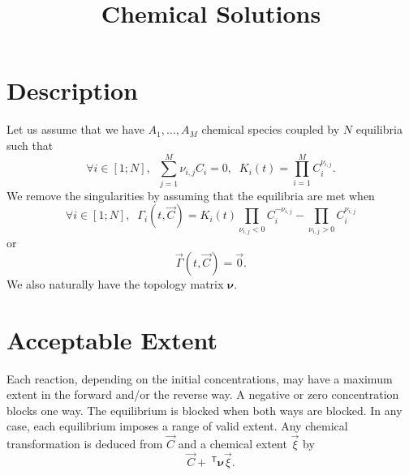 \documentclass[aps]{revtex4}
\newcommand{\mymat}[1]{\bm{#1}}
\newcommand{\mytrn}[1]{~^{\mathsf{T}}{#1}}
\begin{document}
\title{Chemical Solutions}

\section{Description}
Let us assume that we have $A_1,\ldots,A_M$ chemical species coupled by
$N$ equilibria such that
\begin{equation}
	\forall i \in [1;N], \;\; \sum_{j=1}^{M} \nu_{i,j} C_i = 0, \;\; K_i(t) = \prod_{i=1}^{M} C_i^{\nu_{i,j}}.
\end{equation}
We remove the singularities by assuming that the equilibria are met when
\begin{equation}
	\forall i \in [1;N], \;\; \Gamma_i(t,\vec{C}) = K_i(t) \prod_{\nu_{i,j}<0}  C_i^{-\nu_{i,j}} -  \prod_{\nu_{i,j}>0} C_i^{\nu_{i,j}} 
\end{equation}
or
\begin{equation}
	\vec{\Gamma}(t,\vec{C}) = \vec{0}.
\end{equation}
We also naturally have the topology matrix $\mymat{\nu}$.

\section{Acceptable Extent}
Each reaction, depending on the initial concentrations, may have a maximum extent in the forward and/or the reverse way.
A negative or zero concentration blocks one way. The equilibrium is blocked when both ways are blocked.
In any case, each equilibrium imposes a range of valid extent.
Any chemical transformation is deduced from $\vec{C}$ and a chemical extent $\vec{\xi}$ by
$$
	\vec{C} + \mytrn{\mymat{\nu}}\vec{\xi}.
$$
\end{document}
